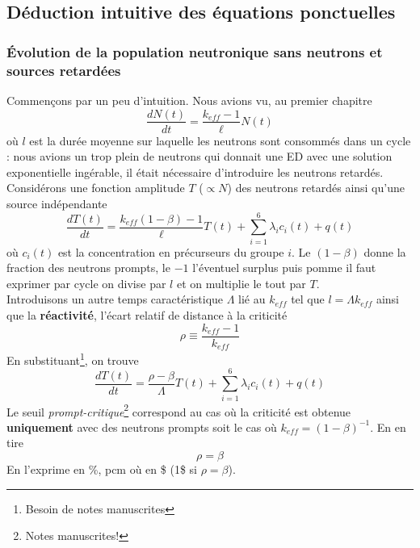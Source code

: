 \subsection{Déduction intuitive des équations ponctuelles}
\subsubsection{Évolution de la population neutronique sans neutrons et sources retardées}
Commençons par un peu d'intuition. Nous avions vu, au premier chapitre
\begin{equation}
\frac{{dN(t)}}{{dt}} = \frac{{{k_{eff}} - 1}}{\ell }N(t)
\end{equation}
où $l$ est la durée moyenne sur laquelle les neutrons sont consommés dans un cycle : nous avions 
un trop plein de neutrons qui donnait une ED avec une solution exponentielle ingérable, il était 
nécessaire d'introduire les neutrons retardés.\\

Considérons une fonction amplitude $T$ ($\propto N$) des neutrons retardés ainsi qu'une source 
indépendante
\begin{equation}
\frac{{dT(t)}}{{dt}} = \frac{{{k_{eff}}(1 - \beta ) - 1}}{\ell }T(t) + \sum\limits_{i = 1}^6    {\lambda _i}{c_i}(t) + q(t)
\end{equation}
où $c_i(t)$ est la concentration en précurseurs du groupe $i$. Le $(1-\beta)$ donne la fraction des neutrons prompts, le $-1$ l'éventuel surplus puis pomme il faut exprimer par cycle on divise par $l$
et on multiplie le tout par $T$. \\

Introduisons un autre temps caractéristique $\Lambda$ lié au $k_{eff}$ tel que $l=\Lambda k_{eff}$ 
ainsi que la \textbf{réactivité}, l'écart relatif de distance à la criticité
\begin{equation}
\rho  \equiv \frac{{{k_{eff}} - 1}}{{{k_{eff}}}}
\end{equation}
En substituant\footnote{Besoin de notes manuscrites}, on trouve
\begin{equation}
\frac{{dT(t)}}{{dt}} = \frac{{\rho  - \beta }}{\Lambda }T(t) + \sum\limits_{i = 1}^6   {\lambda _i}{c_i}(t) + q(t)
\end{equation}
Le seuil \textit{prompt-critique}\footnote{Notes manuscrites!} correspond au cas où la criticité est
obtenue \textbf{uniquement} avec des neutrons prompts soit le cas où $k_{eff}=(1-\beta)^{-1}$. En 
en tire
\begin{equation}
\rho = \beta
\end{equation}
En l'exprime en \%, pcm où en \$ (1\$ si $\rho = \beta$). \\

